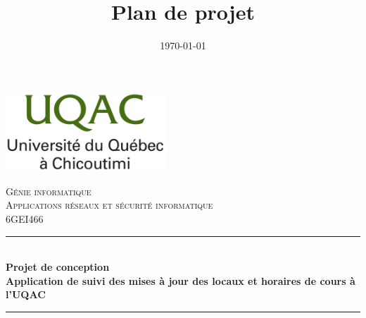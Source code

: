 \documentclass[12pt]{article}
\title{Plan de projet}
\date{\today}
\begin{document}
\begin{titlepage}


    \newcommand{\HRule}{\rule{\linewidth}{0.5mm}} %
     
    \centering  
    \includegraphics[width=6cm]{uqac-logo} \\[2cm] %
     


    \center %
     
    
    \textsc{\LARGE Génie informatique} \\[1.5cm] %
    \textsc{\Large Applications réseaux et sécurité informatique} \\[0.5cm] %
    \textsc{\large 6GEI466} \\[1cm] %
    
    
    \HRule \\[0.4cm]
    \Large \bfseries Projet de conception \\
    \Large Application de suivi des mises à jour des locaux et horaires de cours à l'UQAC \\ %
    \HRule \\[2cm]
     

\end{titlepage}
\end{document}
